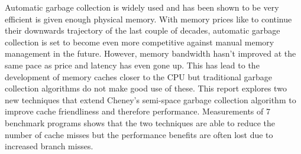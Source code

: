 Automatic garbage collection is widely used and has been shown to be very
efficient is given enough physical memory. With memory prices like to continue
their downwards trajectory of the last couple of decades, automatic garbage
collection is set to become even more competitive against manual memory management
in the future. However, memory bandwidth hasn't improved at the same pace as price
and latency has even gone up. This has lead to the development of memory caches
closer to the CPU but traditional garbage collection algorithms do not make good
use of these. This report explores two new techniques that extend Cheney's
semi-space garbage collection algorithm to improve cache friendliness and therefore
performance. Measurements of 7 benchmark programs shows that the two techniques
are able to reduce the number of cache misses but the performance benefits are
often lost due to increased branch misses.
